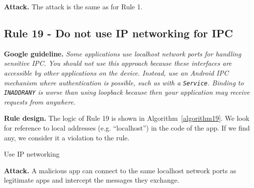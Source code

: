 \textbf{Attack.} The attack is the same as for Rule 1. 

\subsection{Rule 19 - Do not use IP networking for IPC} 
\textbf{Google guideline.} 
\emph{Some applications use \textit{localhost} network ports for handling sensitive IPC. You should not use this approach because these interfaces are accessible by other applications on the device. Instead, use an Android IPC mechanism where authentication is possible, such as with a \texttt{Service}. Binding to \texttt{INADDR\textunderscore ANY} is worse than using loopback because then your application may receive requests from anywhere.}

\textbf{Rule design.} The logic of Rule 19 is shown in Algorithm~\ref{algorithm19}. We look for reference to local addresses (e.g. ``localhost'') in the code of the app. If we find any, we consider it a violation to the rule. 

\setcounter{algocf}{18}
\begin{algorithm}[]
\SetAlgoLined
{}
\caption{Use IP networking}
\label{algorithm19}
\end{algorithm}

\textbf{Attack.} A malicious app can connect to the same localhost network ports as legitimate apps and intercept the messages they exchange. 

